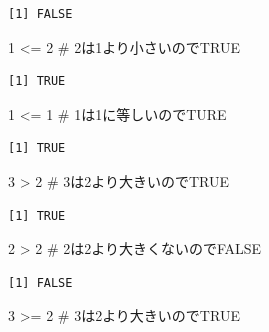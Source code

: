 \documentclass[
  letterpaper,
  DIV=11,
  numbers=noendperiod]{scrreprt}
\newenvironment{Shaded}{\begin{snugshade}}{\end{snugshade}}
\newcommand{\CommentTok}[1]{\textcolor[rgb]{0.37,0.37,0.37}{#1}}
\newcommand{\DecValTok}[1]{\textcolor[rgb]{0.68,0.00,0.00}{#1}}
\newcommand{\SpecialCharTok}[1]{\textcolor[rgb]{0.37,0.37,0.37}{#1}}
\begin{document}
\begin{verbatim}
[1] FALSE
\end{verbatim}

\begin{Shaded}
\begin{Highlighting}[]
\DecValTok{1} \SpecialCharTok{\textless{}=} \DecValTok{2} \CommentTok{\# 2は1より小さいのでTRUE}
\end{Highlighting}
\end{Shaded}

\begin{verbatim}
[1] TRUE
\end{verbatim}

\begin{Shaded}
\begin{Highlighting}[]
\DecValTok{1} \SpecialCharTok{\textless{}=} \DecValTok{1} \CommentTok{\# 1は1に等しいのでTURE}
\end{Highlighting}
\end{Shaded}

\begin{verbatim}
[1] TRUE
\end{verbatim}

\begin{Shaded}
\begin{Highlighting}[]
\DecValTok{3} \SpecialCharTok{\textgreater{}} \DecValTok{2} \CommentTok{\# 3は2より大きいのでTRUE}
\end{Highlighting}
\end{Shaded}

\begin{verbatim}
[1] TRUE
\end{verbatim}

\begin{Shaded}
\begin{Highlighting}[]
\DecValTok{2} \SpecialCharTok{\textgreater{}} \DecValTok{2} \CommentTok{\# 2は2より大きくないのでFALSE}
\end{Highlighting}
\end{Shaded}

\begin{verbatim}
[1] FALSE
\end{verbatim}

\begin{Shaded}
\begin{Highlighting}[]
\DecValTok{3} \SpecialCharTok{\textgreater{}=} \DecValTok{2} \CommentTok{\# 3は2より大きいのでTRUE}
\end{Highlighting}
\end{Shaded}
\end{document}
